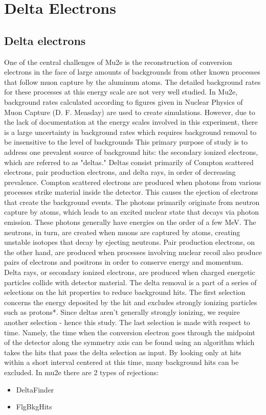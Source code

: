 \chapter{Delta Electrons}
\section{Delta electrons}
One of the central challenges of Mu2e is the reconstruction of conversion electrons in the face of
large amounts of backgrounds from other known processes that follow muon capture by the
aluminum atoms. The detailed background rates for these processes at this energy scale are not very
well studied. In Mu2e, background rates calculated according to figures given in Nuclear Physics of
Muon Capture (D. F. Measday) are used to create simulations. However, due to the lack of
documentation at the energy scales involved in this experiment, there is a large uncertainty in
background rates which requires background removal to be insensitive to the level of backgrounds
This primary purpose of study is to address one prevalent source of background hits: the
secondary ionized electrons, which are referred to as "deltas." Deltas consist primarily of Compton
scattered electrons, pair production electrons, and delta rays, in order of decreasing prevalence.
Compton scattered electrons are produced when photons from various processes strike material
inside the detector. This causes the ejection of electrons that create the background events. The
photons primarily originate from neutron capture by atoms, which leads to an excited nuclear state
that decays via photon emission. These photons generally have energies on the order of a few MeV.
The neutrons, in turn, are created when muons are captured by atoms, creating unstable isotopes that
decay by ejecting neutrons. Pair production electrons, on the other hand, are produced when
processes involving nuclear recoil also produce pairs of electrons and positrons in order to conserve
energy and momentum. Delta rays, or secondary ionized electrons, are produced when charged
energetic particles collide with detector material.
The delta removal is a part of a series of selections on the hit properties to reduce background
hits.
The first selection concerns the energy deposited by the hit and excludes strongly ionizing
particles such as protons*. Since deltas aren't generally strongly ionizing, we require another selection
- hence this study. The last selection is made with respect to time. Namely, the time when the
conversion electron goes through the midpoint of the detector along the symmetry axis can be found
using an algorithm which takes the hits that pass the delta selection as input. By looking only at hits
within a short interval centered at this time, many background hits can be excluded.
In mu2e there are 2 types of rejections:
\begin{itemize}
    \item DeltaFinder
    \item FlgBkgHits
\end{itemize}


